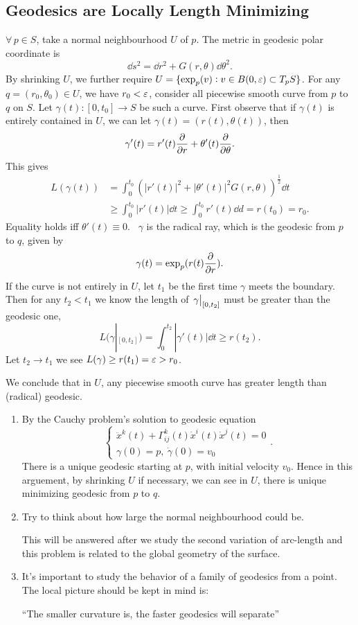 \subsection{Geodesics are Locally Length Minimizing}
\(\forall\,p\in S\), take a normal neighbourhood \(U\) of \(p\). The metric in geodesic
polar coordinate is \[
    \dd{s}^2=\dd{r}^2+G(r,\theta)\dd{\theta}^2
.\] By shrinking \(U\), we further require \(U=\{\exp_p(v):v\in B(0,\varepsilon)\subset
T_p S\}\). For any \(q=(r_0,\theta_0)\in U\), we have \(r_0<\varepsilon\), consider all
piecewise smooth curve from \(p\) to \(q\) on \(S\). Let \(\gamma(t)\colon [0,t_0]
\to S\) be such a curve. First observe that if \(\gamma(t)\) is entirely contained
in \(U\), we can let \(\gamma(t)=(r(t),\theta(t))\), then \[
    \gamma'(t)=r'(t)\pdv{r}+\theta'(t)\pdv{\theta}
.\] This gives 
\begin{align*}
    L(\gamma(t))&=\int_{0}^{t_0}\left(|r'(t)|^2+|\theta'(t)|^2 G(r,\theta)\right)
    ^{\frac{1}{2}}\dd{t} \\
    &\ge \int_{0}^{t_0}|r'(t)|\dd{t}\ge \int_{0}^{t_0}r'(t)\dd{d}=r(t_0)=r_0
.\end{align*}
Equality holds iff \(\theta'(t)\equiv 0\). \ie\ \(\gamma\) is the radical ray, which
is the geodesic from \(p\) to \(q\), given by \[
    \gamma(t)=\exp_p(r(t)\pdv{r})
.\] If the curve is not entirely in \(U\), let \(t_1\) be the first time \(\gamma\)
meets the boundary. Then for any \(t_2<t_1\) we know the length of \(\eval{\gamma}_{
[0,t_2]}\) must be greater than the geodesic one, \ie\ \[
    L(\gamma|_{[0,t_2]})=\int_{0}^{t_2}|\gamma'(t)|\dd{t}\ge r(t_2)
.\] Let \(t_2\to t_1\) we see \(L(\gamma)\ge r(t_1)=\varepsilon>r_0\).

We conclude that in \(U\), any piecewise smooth curve has greater length than
(radical) geodesic.

\begin{remark}
\begin{enumerate}[(1)]
\item By the Cauchy problem's solution to geodesic equation \[
    \begin{cases}
        \ddot{x}^k(t)+\Gamma_{ij}^k(t)\dot{x}^i(t)\dot{x}^j(t)=0 \\
        \gamma(0)=p,\ \dot\gamma(0)=v_0
    \end{cases}
.\] There is a unique geodesic starting at \(p\), with initial velocity \(v_0\). Hence
in this arguement, by shrinking \(U\) if necessary, we can see in \(U\), there is
unique minimizing geodesic from \(p\) to \(q\).
\item {\color{blue}Try to think about how large the normal neighbourhood could be.}

    This will be answered after we study the second variation of arc-length 
    and this problem is related to the global geometry of the surface.
\item It's important to study the behavior of a family of geodesics from a point.
    The local picture should be kept in mind is:

    {\color{orange}``The smaller curvature is, the faster geodesics will separate''}
\end{enumerate}
\end{remark}

